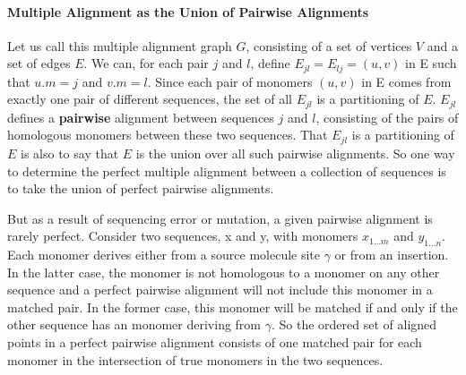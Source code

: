 \documentclass[11pt]{article}
\begin{document}
\paragraph{Multiple Alignment as the Union of Pairwise Alignments\newline}
\par{
Let us call this multiple alignment graph $G$, consisting of a set of vertices $V$ and a set of edges $E$. We can, for each pair $j$ and $l$, define $E_{jl}=E_{lj}=(u,v)$ in E such that $u.m = j$ and $v.m = l$. Since each pair of monomers $(u,v)$ in E comes from exactly one pair of different sequences, the set of all $E_{jl}$ is a partitioning of $E$. $E_{jl}$ defines a \textbf{pairwise} alignment between sequences $j$ and $l$, consisting of the pairs of homologous monomers between these two sequences.  That {$E_{jl}$} is a partitioning of $E$ is also to say that $E$ is the union over all such pairwise alignments.  So one way to determine the perfect multiple alignment between a collection of sequences is to take the union of perfect pairwise alignments.
}
\par{
But as a result of sequencing error or mutation, a given pairwise alignment is rarely perfect.   Consider two sequences, x and y, with monomers $x_{1...m}$ and $y_{1...n}$.   Each monomer derives either from a source molecule site $\gamma$ or from an insertion.  In the latter case, the monomer is not homologous to a monomer on any other sequence and a perfect pairwise alignment will not include this monomer in a matched pair.  In the former case, this monomer will be matched if and only if the other sequence has an monomer deriving from $\gamma$.  So the ordered set of aligned points in a perfect pairwise alignment consists of one matched pair for each monomer in the intersection of true monomers in the two sequences.
}
\end{document}
